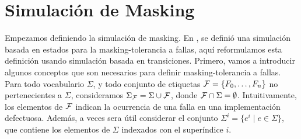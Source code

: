 %

\section{Simulación de Masking} \label{sec:masking_dist}
Empezamos definiendo la simulación de masking. En \cite{DemasiCMA17}, se definió una simulación basada en estados para la masking-tolerancia a fallas, aquí reformulamos esta definición usando simulación basada en transiciones. Primero, vamos a introducir algunos conceptos que son necesarios para definir masking-tolerancia a fallas. Para todo vocabulario $\Sigma$, y todo conjunto de etiquetas $\mathcal{F} = \{F_0, \dots, F_n\}$ no pertenecientes a $\Sigma$, consideramos 
$\Sigma_{\mathcal{F}} = \Sigma \cup \mathcal{F}$, donde $\mathcal{F} \cap \Sigma = \emptyset$. Intuitivamente, los elementos de $\mathcal{F}$ indican la ocurrencia de una falla en una implementación defectuosa. Además, a veces sera útil considerar el conjunto $\Sigma^i = \{ e^i \mid e \in \Sigma\}$, que contiene los elementos de $\Sigma$ indexados con el superíndice $i$.


